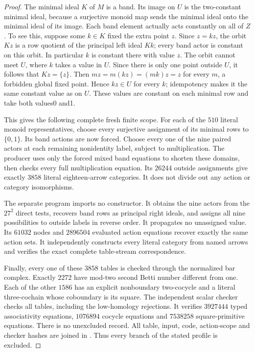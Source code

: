 \begin{proof}
The minimal ideal $K$ of $M$ is a band. Its image
on $U$ is the two-constant minimal ideal, because a
surjective monoid map sends the minimal ideal onto
the minimal ideal of its image. Each band element
actually acts constantly on all of $Z$. To see this,
suppose some $k\in K$ fixed the extra point $z$.
Since $z=kz$, the orbit $Kz$ is a row quotient of
the principal left ideal $Kk$; every band actor is
constant on this orbit. In particular $k$ is constant
there with value $z$. The orbit cannot meet $U$,
where $k$ takes a value in $U$. Since there is only
one point outside $U$, it follows that $Kz=\{z\}$.
Then $mz=m(kz)=(mk)z=z$ for every $m$, a forbidden
global fixed point. Hence $kz\in U$ for every $k$;
idempotency makes it the same constant value as on $U$.
These values are constant on each minimal row and
take both values0 and1.

This gives the following complete fresh finite scope.
For each of the $510$ literal monoid representatives,
choose every surjective assignment of its minimal
rows to $\{0,1\}$. Its band actions are now forced.
Choose every one of the nine paired actors at each
remaining nonidentity label, subject to multiplication.
The producer
 uses only
the forced mixed band equations to shorten these
domains, then checks every full multiplication equation.
Its $26244$ outside assignments give exactly $3858$
literal eighteen-arrow categories. It does not divide
out any action or category isomorphisms.

The separate program
imports no constructor. It obtains the nine actors
from the $27^2$ direct tests, recovers band rows as
principal right ideals, and assigns all nine possibilities
to outside labels in reverse order. It propagates no
unassigned value. Its $61032$ nodes and $2896504$
evaluated action equations recover exactly the same
action sets. It independently constructs every literal
category from named arrows and verifies the exact
complete table-stream correspondence.

Finally, every one of these $3858$ tables is checked
through the normalized bar complex. Exactly $2272$
have mod-two second Betti number different from one.
Each of the other $1586$ has an explicit nonboundary
two-cocycle and a literal three-cochain whose coboundary
is its square. The independent scalar checker
 checks all
tables, including the low-homology rejections. It verifies
$3927444$ typed associativity equations, $1076894$
cocycle equations and $7538258$ square-primitive
equations. There is no unexcluded record.
All table, input, code, action-scope and checker hashes
are joined in
.
Thus every branch of the stated profile is excluded.
\end{proof}
